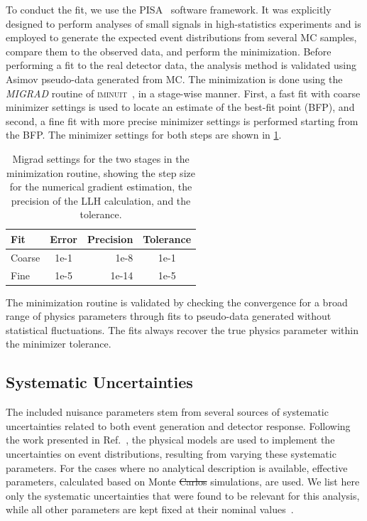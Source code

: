 \documentclass[
    aps,
    prd,
    reprint,
    amsmath,
    amssymb,
    nofootinbib,
    superscriptaddress,
    floatfix
]{revtex4-2}
\providecommand{\DIFaddtex}[1]{{\protect\color{blue}\uwave{#1}}} %
\providecommand{\DIFdeltex}[1]{{\protect\color{red}\sout{#1}}}                      %
\providecommand{\DIFaddbegin}{} %
\providecommand{\DIFaddend}{} %
\providecommand{\DIFdelbegin}{} %
\providecommand{\DIFdelend}{} %
\providecommand{\DIFadd}[1]{\texorpdfstring{\DIFaddtex{#1}}{#1}} %
\providecommand{\DIFdel}[1]{\texorpdfstring{\DIFdeltex{#1}}{}} %
\newcommand{\DIFscaledelfig}{0.5}
\newlength{\DIFdelgraphicswidth} %
\newlength{\DIFdelgraphicsheight} %
\newcommand{\DIFaddincludegraphics}[2][]{{\color{blue}\fbox{\DIFOincludegraphics[#1]{#2}}}} %
\newcommand{\DIFdelincludegraphics}[2][]{%
\sbox{\DIFdelgraphicsbox}{\DIFOincludegraphics[#1]{#2}}%
\settoboxwidth{\DIFdelgraphicswidth}{\DIFdelgraphicsbox} %
\settoboxtotalheight{\DIFdelgraphicsheight}{\DIFdelgraphicsbox} %
\scalebox{\DIFscaledelfig}{%
\parbox[b]{\DIFdelgraphicswidth}{\usebox{\DIFdelgraphicsbox}\\[-\baselineskip] \rule{\DIFdelgraphicswidth}{0em}}\llap{\resizebox{\DIFdelgraphicswidth}{\DIFdelgraphicsheight}{%
\setlength{\unitlength}{\DIFdelgraphicswidth}%
\begin{picture}(1,1)%
\thicklines\linethickness{2pt} %
{\color[rgb]{1,0,0}\put(0,0){\framebox(1,1){}}}%
{\color[rgb]{1,0,0}\put(0,0){\line( 1,1){1}}}%
{\color[rgb]{1,0,0}\put(0,1){\line(1,-1){1}}}%
\end{picture}%
}\hspace*{3pt}}} %
} %
\DeclareRobustCommand{\DIFaddbegin}{\DIFOaddbegin \let\includegraphics\DIFaddincludegraphics} %
\DeclareRobustCommand{\DIFaddend}{\DIFOaddend \let\includegraphics\DIFOincludegraphics} %
\DeclareRobustCommand{\DIFdelbegin}{\DIFOdelbegin \let\includegraphics\DIFdelincludegraphics} %
\DeclareRobustCommand{\DIFdelend}{\DIFOaddend \let\includegraphics\DIFOincludegraphics} %
\begin{document}
To conduct the fit, we use the \textsc{PISA}~\cite{pisa_paper, pisa_software} software framework.
It was explicitly designed to perform analyses of small signals in high-statistics experiments and is employed to generate the expected event distributions from several MC samples, compare them to the observed data, and perform the minimization.
Before performing a fit to the real detector data, the analysis method is validated using Asimov pseudo-data generated from MC.
The minimization is done using the \textit{MIGRAD} routine of \textsc{iminuit}~\cite{iminuit_v2.17.0}, in  a stage-wise manner.
First, a fast fit with coarse minimizer settings is used to locate an estimate of the best-fit point (BFP), and second, a fine fit with more precise minimizer settings is performed starting from the BFP. The minimizer settings for both steps are shown in \cref{tab:minimization_settings}.

\begin{table}[h]
        \begin{tabular}{ lcrc }
        \hline\hline
        \textbf{Fit} & \textbf{Error} & \textbf{Precision} & \textbf{Tolerance} \\
        \hline\hline
        Coarse & 1e-1 & 1e-8 & 1e-1 \\
        Fine & 1e-5 & 1e-14 & 1e-5 \\
        \hline
        \end{tabular}
    \caption{Migrad settings for the two stages in the minimization routine, showing the step size for the numerical gradient estimation, the precision of the LLH calculation, and the tolerance.}
    \label{tab:minimization_settings}
\end{table}

The minimization routine is validated by checking the convergence for a broad range of physics parameters through fits to pseudo-data generated without statistical fluctuations.
The fits always recover the true physics parameter within the minimizer tolerance.


\subsection{\label{sec:uncertainties} Systematic Uncertainties}

The included nuisance parameters stem from several sources of systematic uncertainties related to both event generation and detector response. Following the work presented in Ref.~\cite{IceCubeCollaboration:2023wtb}, the physical models are used to implement the uncertainties on event distributions, resulting from varying these systematic parameters. For the cases where no analytical description is available, effective parameters, calculated based on Monte \DIFdelbegin \DIFdel{Carlos }\DIFdelend \DIFaddbegin \DIFadd{Carlo }\DIFaddend simulations, are used. We list here only the systematic uncertainties that were found to be relevant for this analysis, while all other parameters are kept fixed at their nominal values~\cite{Fischer_2023}.
\end{document}
